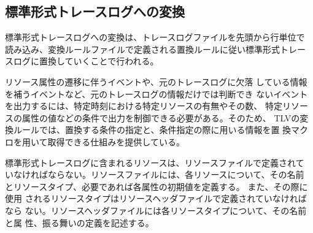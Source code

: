 



\subsection{標準形式トレースログへの変換}\label{convertRule}
標準形式トレースログへの変換は、トレースログファイルを先頭から行単位で
読み込み、変換ルールファイルで定義される置換ルールに従い標準形式トレー
スログに置換していくことで行われる。

リソース属性の遷移に伴うイベントや、元のトレースログに欠落
している情報を補うイベントなど、元のトレースログの情報だけでは判断でき
ないイベントを出力するには、特定時刻における特定リソースの有無やその数、
特定リソースの属性の値などの条件で出力を制御できる必要がある。そのため、
TLVの変換ルールでは、置換する条件の指定と、条件指定の際に用いる情報を置
換マクロを用いて取得できる仕組みを提供している。

標準形式トレースログに含まれるリソースは、リソースファイルで定義されて
いなければならない。リソースファイルには、各リソースについて、その名前
とリソースタイプ、必要であれば各属性の初期値を定義する。
また、その際に使用
されるリソースタイプはリソースヘッダファイルで定義されていなければなら
ない。リソースヘッダファイルには各リソースタイプについて、その名前と属
性、振る舞いの定義を記述する。


